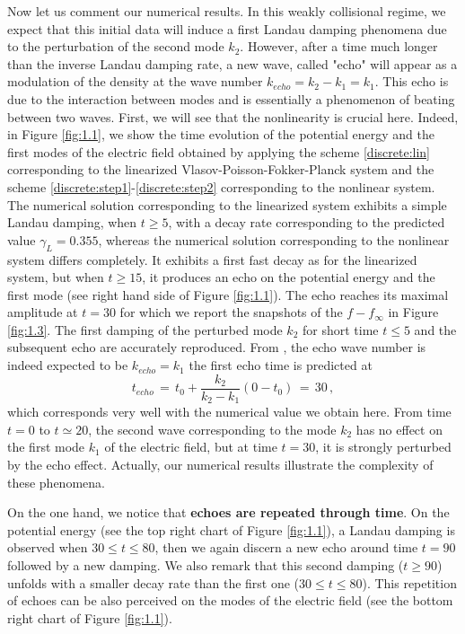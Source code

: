 \documentclass[11pt]{amsart}
\numberwithin{equation}{section}
\numberwithin{figure}{section}
\begin{document}
Now let us comment our numerical results. In this weakly collisional regime, we expect that this initial data
will induce a first Landau damping phenomena due to the perturbation
of the second mode $k_2$. However, after a time much longer than the
inverse Landau damping rate, a new wave, called "echo" will appear as
a modulation of the density at the wave number $k_{echo} = k_2-k_1=
k_1$. This echo is due to the interaction between modes and is
essentially a phenomenon of beating between two waves. First, we will
see that the nonlinearity is crucial here. Indeed, in Figure
\ref{fig:1.1}, we show the time evolution of the potential energy and the first modes of
the electric field  obtained by applying the scheme \eqref{discrete:lin} corresponding to the linearized Vlasov-Poisson-Fokker-Planck
system and the scheme \eqref{discrete:step1}-\eqref{discrete:step2}
corresponding to the nonlinear system.  The numerical solution corresponding to the linearized system exhibits
a simple Landau damping, when $t\geq 5$, with a decay rate corresponding to the 
predicted value $\gamma_L = 0.355$, whereas the numerical solution
corresponding to the nonlinear system differs completely. It exhibits a
first fast decay  as for the linearized system, but when $t\geq 15$,
it produces an echo on the potential energy and the first mode (see
right hand side of Figure \ref{fig:1.1}). The echo reaches its maximal amplitude at
$t=30$ for which we report the snapshots of the $f-f_\infty$ in Figure
\ref{fig:1.3}.  The first damping of the
perturbed mode $k_2$ for short time $t\leq 5$ and the subsequent echo are
accurately reproduced. From \cite{filbetCPC},  the echo wave number
is indeed expected to be $k_{echo} = k_1$ the first echo time
is predicted at 
$$
t_{echo}  \,=\, t_0+\frac{k_2}{k_2-k_1}(0-t_0)\,=\,30\,,
$$ 
which corresponds very well with the numerical value we obtain here. From time $t=0$
to $t\simeq 20$, the second wave corresponding to the mode $k_2$ has no
effect on the first mode $k_1$ of the electric field, but at time
$t=30$, it is strongly perturbed by the echo effect. Actually, our
numerical results illustrate the complexity of these phenomena. 


On the one hand,   we notice that \textbf{echoes are repeated  through time}. On the
potential energy (see the top right chart of Figure \ref{fig:1.1}), a Landau
damping  is observed when $30\leq t\leq 80$, then we again discern a new echo around time
$t=90$ followed by a new damping. We also remark that this second damping ($t\geq 90$) unfolds with a smaller decay rate than the first one ($30\leq t\leq 80$). This repetition
of echoes can be also perceived on the modes of the electric field (see the bottom right chart of Figure \ref{fig:1.1}). 
\end{document}
